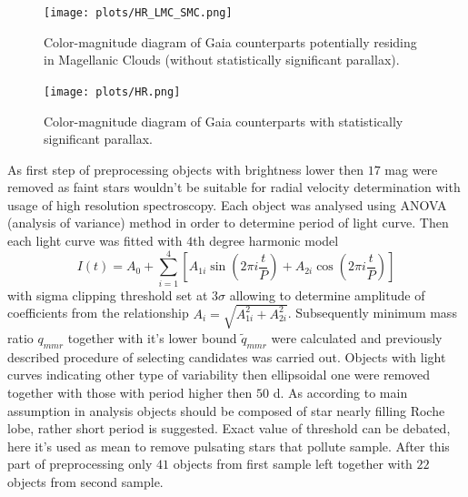 \documentclass{pracalicmgr}
\begin{document}
\begin{figure}[H]
    \begin{center}
        \texttt{[image: plots/HR\_LMC\_SMC.png]}
    \end{center}
    \caption{Color-magnitude diagram of Gaia counterparts potentially residing in Magellanic Clouds (without statistically significant parallax).}
    \label{HR_SMC}
\end{figure}

\begin{figure}[H]
    \begin{center}
        \texttt{[image: plots/HR.png]}
    \end{center}
    \caption{Color-magnitude diagram of Gaia counterparts with statistically significant parallax.}
    \label{HR_galactic}
\end{figure}
As first step of preprocessing objects with brightness lower then
$17$ mag  were removed as faint stars wouldn't be suitable for radial velocity determination with usage of high resolution spectroscopy.
Each object was analysed using ANOVA (analysis of variance) method \citep{schwarzenberg-czerny_advantage_1989} in order to determine period of light curve.
Then each light curve was fitted with $4$th degree harmonic model
\begin{equation}\label{harm}
    I(t)=A_0+\sum_{i=1}^4\left[ A_{1i}\sin{\left(2\pi i\frac{t}{P}\right)}+A_{2i}\cos{\left(2\pi i\frac{t}{P}\right)}\right]
\end{equation}
with sigma clipping threshold set at $3\sigma$ allowing to determine amplitude of coefficients from the relationship $A_i=\sqrt{A_{1i}^2+A_{2i}^2}$.
 Subsequently minimum mass ratio $q_{mmr}$ together with it's lower bound $\tilde{q}_{mmr}$ were calculated and previously described procedure of selecting candidates was carried out.
Objects with light curves indicating other type of variability then ellipsoidal one were removed together with those with period higher then
$50$ d. As according to main assumption in analysis objects should be composed of star nearly filling Roche lobe, rather short period is suggested. Exact value of threshold can be debated, here it's used as mean to 
remove pulsating stars that pollute sample. After this part of preprocessing only $41$ objects from first sample left together with $22$ objects from second sample.
\end{document}

